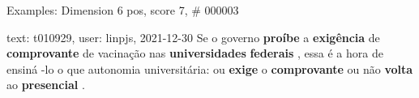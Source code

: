 \begin{frame}{Examples: Dimension 6 pos, score 7, \# 000003}
\footnotesize
\begin{exampleblock}{text: t010929, user: linpjs, 2021-12-30}
Se o governo \textbf{proíbe} a \textbf{exigência} de \textbf{comprovante} de 
vacinação nas \textbf{universidades} \textbf{federais} , essa é a hora de 
ensiná -lo o que autonomia universitária: ou \textbf{exige} o 
\textbf{comprovante} ou não \textbf{volta} ao \textbf{presencial} . 
\end{exampleblock}
\end{frame}
